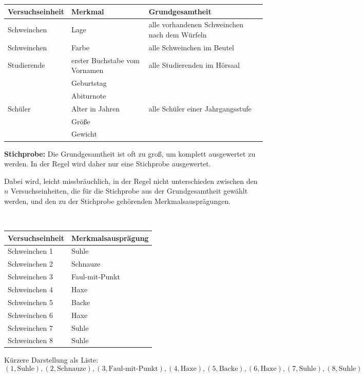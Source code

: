 \begin{mytable}
    \begin{tabular}{lll}
        \hline
        \textbf{Versuchseinheit} & \textbf{Merkmal} & \textbf{Grundgesamtheit} \\
        \hline
        Schweinchen & Lage & alle vorhandenen Schweinchen nach dem Würfeln \\
        Schweinchen & Farbe & alle Schweinchen im Beutel \\
        Studierende & erster Buchstabe vom Vornamen & alle Studierenden im Hörsaal \\
        & Geburtstag & \\
        & Abiturnote & \\
        Schüler     & Alter in Jahren & alle Schüler einer Jahrgangsstufe \\
        & Größe & \\
        & Gewicht & \\
        \hline
    \end{tabular}
\end{mytable}

\textbf{Stichprobe:} Die \gls{Grundgesamtheit} ist oft zu groß, um komplett ausgewertet zu werden.
In der Regel wird daher nur eine Stichprobe ausgewertet.


Dabei wird, leicht missbräuchlich, in der Regel nicht unterschieden zwischen den $n$ \gls{Versuchseinheit}en, die
für die Stichprobe aus der \gls{Grundgesamtheit} gewählt werden, und den zu der Stichprobe gehörenden \gls{Merkmal}sausprägungen.



\begin{bsp}   \\
    \begin{mytable}
        \begin{tabular}{ll}
            \hline
            \textbf{Versuchseinheit} & \textbf{Merkmalsausprägung} \\
            \hline
            Schweinchen 1 & Suhle \\
            Schweinchen 2 & Schnauze \\
            Schweinchen 3 & Faul-mit-Punkt \\
            Schweinchen 4 & Haxe \\
            Schweinchen 5 & Backe \\
            Schweinchen 6 & Haxe \\
            Schweinchen 7 & Suhle \\
            Schweinchen 8 & Suhle \\
            \hline
        \end{tabular}
    \end{mytable}

    Kürzere Darstellung als Liste:
    \[
        (1,\text{Suhle}),(2,\text{Schnauze}),(3,\text{Faul-mit-Punkt}),(4,\text{Haxe}),(5,\text{Backe}),(6,\text{Haxe}),(7,\text{Suhle}),(8,\text{Suhle})
    \]
\end{bsp}

